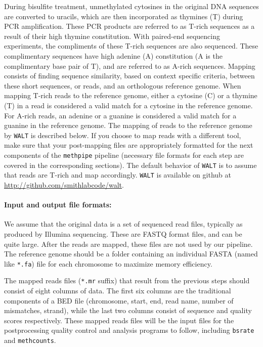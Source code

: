 \documentclass[10pt]{article}
\newcommand{\meth}{\texttt{methpipe}}
\newcommand{\prog}[1]{\texttt{#1}}
\newcommand{\fn}[1]{\texttt{#1}}
\begin{document}
During bisulfite treatment, unmethylated cytosines in the original DNA
sequences are converted to uracils, which are then incorporated as
thymines (T) during PCR amplification. These PCR products are referred
to as T-rich sequences as a result of their high thymine
constitution. With paired-end sequencing experiments, the compliments
of these T-rich sequences are also sequenced.  These complimentary
sequences have high adenine (A) constitution (A is the complimentary
base pair of T), and are referred to as A-rich sequences. Mapping
consists of finding sequence similarity, based on context specific
criteria, between these short sequences, or reads, and an orthologous
reference genome.  When mapping T-rich reads to the
reference genome, either a cytosine (C) or a thymine (T) in a read is
considered a valid match for a cytosine in the reference genome. For
A-rich reads, an adenine or a guanine is considered a valid match for
a guanine in the reference genome. The mapping of reads to the
reference genome by \prog{WALT} is described below. If you choose
to map reads with a different tool, make sure that your post-mapping
files are appropriately formatted for the next components of the
\meth{} pipeline (necessary file formats for each step are covered in
the corresponding sections).  The default behavior of \prog{WALT} is to
assume that reads are T-rich and map accordingly. \prog{WALT} is available 
on github at \href{http://github.com/smithlabcode/walt}
{http://github.com/smithlabcode/walt}.

\paragraph{Input and output file formats:} We assume that the original
data is a set of sequenced read files, typically as produced by
Illumina sequencing. These are FASTQ format files, and can be quite
large. After the reads are mapped, these files are not used by our
pipeline.  The reference genome should be a folder containing an
individual FASTA (named like \fn{*.fa}) file for each chromosome to
maximize memory efficiency.

The mapped reads files (\fn{*.mr} suffix) that result from the
previous steps should consist of eight columns of data. The first six
columns are the traditional components of a BED file (chromosome,
start, end, read name, number of mismatches, strand), while the last
two columns consist of sequence and quality scores respectively. These
mapped reads files will be the input files for the postprocessing quality
control and analysis programs to follow, including \prog{bsrate} and
\prog{methcounts}.
\end{document}
